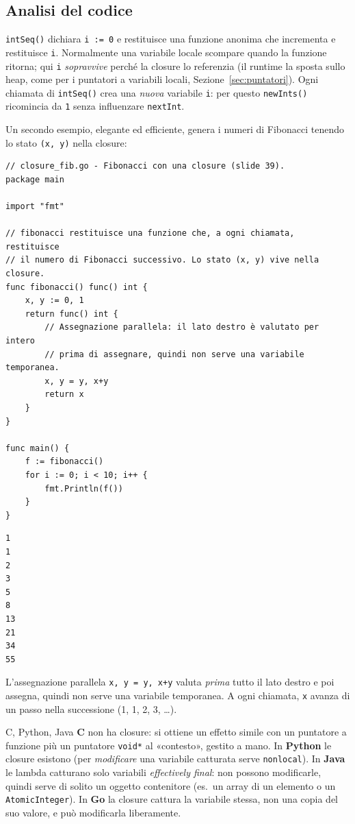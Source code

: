 \documentclass[11pt,a4paper]{report}
\newcommand{\cod}[1]{\texttt{#1}}
\begin{document}
\subsection{Analisi del codice}

\cod{intSeq()} dichiara \cod{i := 0} e restituisce una funzione anonima che
incrementa e restituisce \cod{i}. Normalmente una variabile locale scompare quando
la funzione ritorna; qui \cod{i} \emph{sopravvive} perché la closure lo
referenzia (il runtime la sposta sullo heap, come per i puntatori a variabili
locali, Sezione~\ref{sec:puntatori}). Ogni chiamata di \cod{intSeq()} crea una
\emph{nuova} variabile \cod{i}: per questo \cod{newInts()} ricomincia da
\cod{1} senza influenzare \cod{nextInt}.

Un secondo esempio, elegante ed efficiente, genera i numeri di Fibonacci
tenendo lo stato \cod{(x, y)} nella closure:

\begin{lstlisting}[style=gocode,caption={\texttt{02\_functions/closure\_fib.go}}]
// closure_fib.go - Fibonacci con una closure (slide 39).
package main

import "fmt"

// fibonacci restituisce una funzione che, a ogni chiamata, restituisce
// il numero di Fibonacci successivo. Lo stato (x, y) vive nella closure.
func fibonacci() func() int {
	x, y := 0, 1
	return func() int {
		// Assegnazione parallela: il lato destro è valutato per intero
		// prima di assegnare, quindi non serve una variabile temporanea.
		x, y = y, x+y
		return x
	}
}

func main() {
	f := fibonacci()
	for i := 0; i < 10; i++ {
		fmt.Println(f())
	}
}
\end{lstlisting}
\begin{lstlisting}[style=output]
1
1
2
3
5
8
13
21
34
55
\end{lstlisting}

L'assegnazione parallela \cod{x, y = y, x+y} valuta \emph{prima} tutto il lato
destro e poi assegna, quindi non serve una variabile temporanea. A ogni
chiamata, \cod{x} avanza di un passo nella successione (1, 1, 2, 3, \ldots).

\begin{confronto}{C, Python, Java}
\textbf{C} non ha closure: si ottiene un effetto simile con un puntatore a
funzione più un puntatore \cod{void*} al «contesto», gestito a mano. In
\textbf{Python} le closure esistono (per \emph{modificare} una variabile
catturata serve \cod{nonlocal}). In \textbf{Java} le lambda catturano solo
variabili \emph{effectively final}: non possono modificarle, quindi serve di
solito un oggetto contenitore (es.\ un array di un elemento o un
\cod{AtomicInteger}). In \textbf{Go} la closure cattura la variabile stessa, non una
copia del suo valore, e può modificarla liberamente.
\end{confronto}
\end{document}
